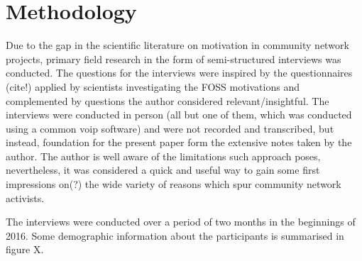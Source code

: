 \section{Methodology}

Due to the gap in the scientific literature on motivation in community network projects, primary field research in the form of semi-structured interviews was conducted.
The questions for the interviews were inspired by the questionnaires (cite!) applied by scientists investigating the FOSS motivations and complemented by questions the author considered relevant/insightful. %
The interviews were conducted in person (all but one of them, which was conducted using a common voip software) and were not recorded and transcribed, but instead, foundation for the present paper form the extensive notes taken by the author. %
The author is well aware of the limitations such approach poses, nevertheless, it was considered a quick and useful way to gain some first impressions on(?) the wide variety of reasons which spur community network activists.

The interviews were conducted over a period of two months in the beginnings of 2016.
Some demographic information about the participants is summarised in figure X.


\begin{comment}
\begin{itemize}
  \item literature review for FOSS <-- only as comparison
  \item semi-structured interviews for Freifunk <-- focus
    \begin{itemize}
      \item limitations of the methodology
    \end{itemize}
\end{itemize}
\end{comment}
